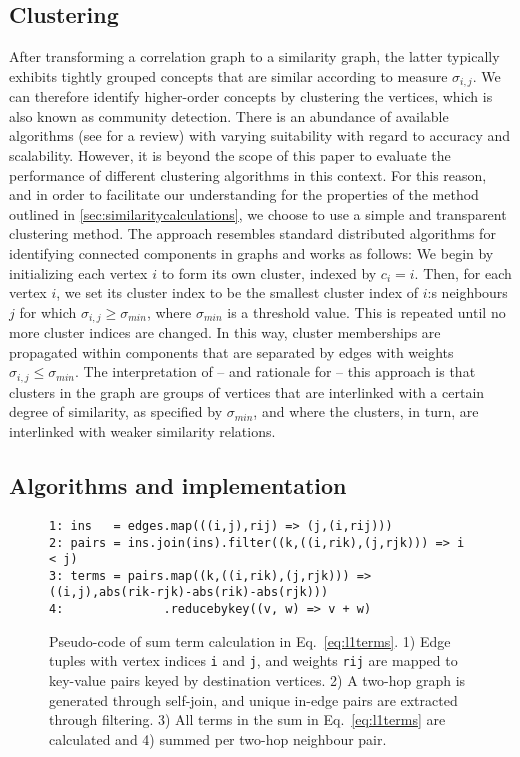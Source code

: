 \documentclass{sig-alternate}
\newcommand{\sy}[1]{\sigma_{#1}}
\begin{document}
\subsection{Clustering}
\begin{sloppypar}
After transforming a correlation graph to a similarity graph, the latter typically exhibits tightly grouped
concepts that are similar according to measure $\sy{i,j}$. We can therefore identify higher-order concepts by
clustering the vertices, which is also known as community detection. There is an abundance of available algorithms
(see \cite{Fortunato-2010} for a review) with varying suitability with regard to accuracy and scalability. However, it is
beyond the scope of this paper to evaluate the performance of different clustering algorithms in this context.
For this reason, and in order to facilitate
our understanding for the properties of the method outlined in \ref{sec:similaritycalculations},
we choose to use a simple and transparent clustering method. The approach resembles standard distributed algorithms
for identifying connected components in graphs and works as follows: We begin by initializing
each vertex $i$ to form its own cluster, indexed by $c_i = i$. Then, for each vertex $i$, we set its cluster index to be the smallest cluster
index of $i$:s neighbours $j$ for which $\sy{i,j} \geq \sigma_{min}$, where $\sigma_{min}$ is a threshold value. This is repeated until no more cluster indices are changed. In this way, cluster memberships are propagated within
components that are separated by edges with weights $\sy{i,j} \leq  \sigma_{min}$. The interpretation of --
and rationale for -- this approach is that clusters in the graph are groups of vertices that are interlinked with a certain degree of similarity,
as specified by $\sigma_{min}$, and where the clusters, in turn, are interlinked with weaker similarity relations.
\end{sloppypar}

\subsection{Algorithms and implementation}
\label{subsec:algorithmsAndImplementation}

\begin{figure*}
\begin{lstlisting}
1: ins   = edges.map(((i,j),rij) => (j,(i,rij)))
2: pairs = ins.join(ins).filter((k,((i,rik),(j,rjk))) => i < j)
3: terms = pairs.map((k,((i,rik),(j,rjk))) => ((i,j),abs(rik-rjk)-abs(rik)-abs(rjk)))
4:              .reducebykey((v, w) => v + w)
\end{lstlisting}
\caption{Pseudo-code of sum term calculation in Eq.\ \ref{eq:l1terms}. 1) Edge tuples with vertex indices \texttt{i} and \texttt{j}, and weights \texttt{rij} are mapped to key-value pairs keyed by destination vertices. 2) A two-hop graph is generated through self-join, and unique in-edge pairs are extracted through filtering. 3) All terms in the sum in Eq.\ \ref{eq:l1terms} are calculated and 4) summed per two-hop neighbour pair.
}
\label{fig:pseudocode}
\end{figure*}
\end{document}
